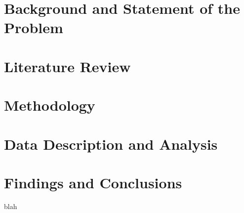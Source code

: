 \documentclass[12pt,letterpaper,oneside]{book}
\begin{document}
\frontmatter
	\flyleaf
	\disclaimerpage                 
	\titlepageAFIT                      
	\committeepage  
	
	
	
	\tableofcontents
	\listoffigures
	\listoftables
	\listofsymbols
	\listofabbreviations
	

\mainmatter
	\chapter{Background and Statement of the Problem}
		
		
	\chapter{Literature Review}
		

	\chapter{Methodology}
		

	\chapter{Data Description and Analysis}
		

	\chapter{Findings and Conclusions}
		
		blah \cite{abd}
	
\backmatter
	\singlespace
	
	 

	

  	
\end{document}
